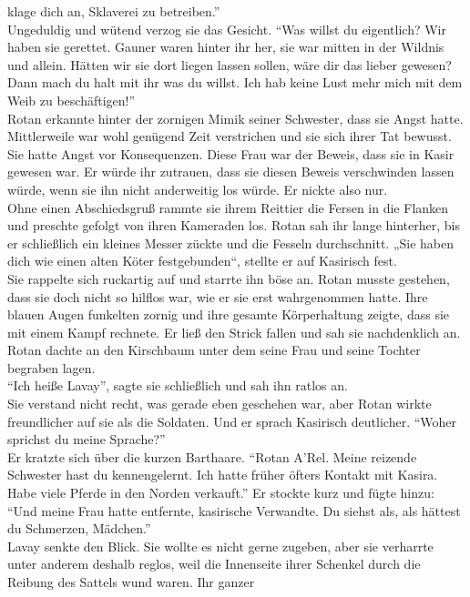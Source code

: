 klage dich an, Sklaverei zu betreiben.''\\
Ungeduldig und wütend verzog sie das Gesicht. ``Was willst du eigentlich? Wir haben sie gerettet. 
Gauner waren hinter ihr her, sie war mitten in der Wildnis und allein. Hätten wir sie dort liegen 
lassen sollen, wäre dir das lieber gewesen? Dann mach du halt mit ihr was du willst. Ich hab keine 
Lust mehr mich mit dem Weib zu beschäftigen!''\\
Rotan erkannte hinter der zornigen Mimik seiner Schwester, dass sie Angst hatte. Mittlerweile war 
wohl genügend Zeit verstrichen und sie sich ihrer Tat bewusst. Sie hatte Angst vor Konsequenzen. 
Diese Frau war der Beweis, dass sie in Kasir gewesen war. Er würde ihr zutrauen, dass sie diesen 
Beweis verschwinden lassen würde, wenn sie ihn nicht anderweitig los würde. Er nickte also nur.\\
Ohne einen Abschiedsgruß rammte sie ihrem Reittier die Fersen in die Flanken und preschte gefolgt 
von ihren Kameraden los. Rotan sah ihr lange hinterher, bis er schließlich ein kleines Messer 
zückte 
und die Fesseln durchschnitt. „Sie haben dich wie einen alten Köter festgebunden“, stellte er auf 
Kasirisch fest.\\
Sie rappelte sich ruckartig auf und starrte ihn böse an. Rotan musste gestehen, dass sie doch nicht 
so hilflos war, wie er sie erst wahrgenommen hatte. Ihre blauen Augen funkelten zornig und ihre 
gesamte Körperhaltung zeigte, dass sie mit einem Kampf rechnete. Er ließ den Strick fallen und sah 
sie nachdenklich an. Rotan dachte an den Kirschbaum unter dem seine Frau und seine Tochter begraben 
lagen.\\
``Ich heiße Lavay'', sagte sie schließlich und sah ihn ratlos an. \\
Sie verstand nicht recht, was gerade eben geschehen war, aber Rotan wirkte freundlicher auf sie als 
die Soldaten. Und er sprach Kasirisch deutlicher. ``Woher sprichst du meine Sprache?''\\
Er kratzte sich über die kurzen Barthaare. ``Rotan A'Rel. Meine reizende Schwester hast du 
kennengelernt. Ich hatte früher öfters Kontakt mit Kasira. Habe viele Pferde in den Norden 
verkauft.'' Er stockte kurz und fügte hinzu: ``Und meine Frau hatte entfernte, kasirische 
Verwandte. Du siehst als, als hättest du Schmerzen, Mädchen.''\\
Lavay senkte den Blick. Sie wollte es nicht gerne zugeben, aber sie verharrte unter anderem deshalb 
reglos, weil die Innenseite ihrer Schenkel durch die Reibung des Sattels wund waren. Ihr ganzer 
